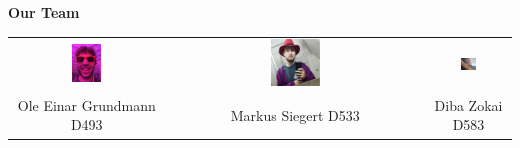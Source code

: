 \documentclass{article}
\begin{document}
\begin{titlepage}
    \begin{center}
        \textbf{\textcolor{TikTokBlack}{\Large Our Team}} \\[0.5cm]

        \begin{tabular}{ccc}
            \includegraphics[width=0.2\textwidth]{./resources/ole.png} &
            \includegraphics[width=0.2\textwidth]{./resources/markus.png} &
            \includegraphics[width=0.2\textwidth]{./resources/diba.png} \\[0.3cm]
            Ole Einar Grundmann D493 & Markus Siegert D533 & Diba Zokai D583 \\
        \end{tabular}
    \end{center}
\end{titlepage}

\newpage
\tableofcontents
\newpage
\end{document}
